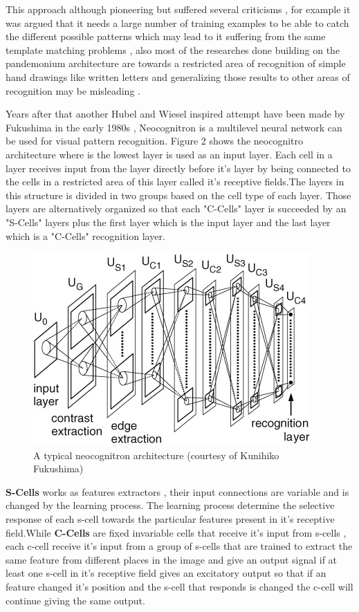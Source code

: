 \documentclass[12pt,twoside]{article}
\theoremstyle{plain}
\theoremstyle{definition}
\theoremstyle{remark}
\begin{document}
This approach although pioneering but suffered several criticisms , for example it was argued that it needs a large number of training examples to be able to catch the different possible patterns which may lead to it suffering from the same template matching problems \cite{minsky69perceptrons}, also most of the researches done building on the  pandemonium architecture are towards a restricted area of recognition of simple hand drawings like written 
letters and generalizing those results to other areas of recognition may be misleading \cite{Grainger2008}. 

Years after that another Hubel and Wiesel inspired attempt have been made by Fukushima in the early 1980s \cite{FukushimaM82} \cite{Fukushima1988}, Neocognitron is a multilevel neural network can be used for visual pattern recognition. Figure 2 shows the neocognitro architecture where is the lowest layer is used as an input layer. Each cell in a layer receives input from the layer directly before it's layer by being connected to the cells in a restricted area of this layer called it's  receptive fields.The layers in this structure is divided in two groups based on the cell type of each layer. Those layers are alternatively organized so that each "C-Cells" layer is succeeded by an "S-Cells" layers plus the first layer which is the input layer and the last layer which is a "C-Cells" recognition layer.

\begin{figure}[hbtp]
\centering
\includegraphics[scale=1]{Images/ScholarFig1.jpg}
\caption{A typical neocognitron architecture (courtesy of Kunihiko Fukushima) }
\end{figure}
\textbf{S-Cells} works as features extractors , their input connections are variable and is changed by the learning process. The learning process determine the selective response of each s-cell towards the particular features present in it's receptive field.While \textbf{C-Cells} are fixed invariable cells that receive it's input from s-cells , each c-cell receive it's input from a group of s-cells that are trained to extract the same feature from different places in the image and give an output signal if at least one s-cell in it's receptive field  gives an excitatory output so that if an feature changed it's position and the s-cell that responds is changed the c-cell will continue giving the same output.
\end{document}

